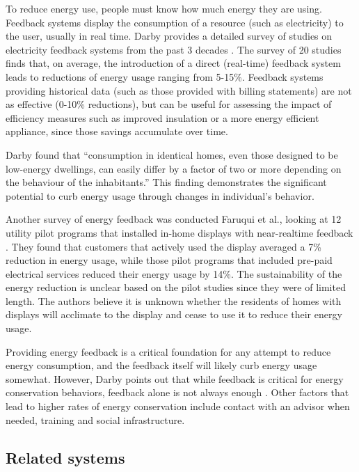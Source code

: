 To reduce energy use, people must know how much energy they are using. Feedback systems display the consumption of a resource (such as electricity) to the user, usually in real time. Darby provides a detailed survey of studies on electricity feedback systems from the past 3 decades \cite{darby-review-2006}. The survey of 20 studies finds that, on average, the introduction of a direct (real-time) feedback system leads to reductions of energy usage ranging from 5-15\%. Feedback systems providing historical data (such as those provided with billing statements) are not as effective (0-10\% reductions), but can be useful for assessing the impact of efficiency measures such as improved insulation or a more energy efficient appliance, since those savings accumulate over time.

Darby found that ``consumption in identical homes, even those designed to be low-energy dwellings, can easily differ by a factor of two or more depending on the behaviour of the inhabitants.'' This finding demonstrates the significant potential to curb energy usage through changes in individual's behavior.

Another survey of energy feedback was conducted Faruqui et al., looking at 12 utility pilot programs that installed in-home displays with near-realtime feedback \cite{Faruqui09}. They found that customers that actively used the display averaged a 7\% reduction in energy usage, while those pilot programs that included pre-paid electrical services reduced their energy usage by 14\%. The sustainability of the energy reduction is unclear based on the pilot studies since they were of limited length. The authors believe it is unknown whether the residents of homes with displays will acclimate to the display and cease to use it to reduce their energy usage.

Providing energy feedback is a critical foundation for any attempt to reduce energy consumption, and the feedback itself will likely curb energy usage somewhat. However, Darby points out that while feedback is critical for energy conservation behaviors, feedback alone is not always enough \cite{darby-2000-making-it-obvious}. Other factors that lead to higher rates of energy conservation include contact with an advisor when needed, training and social infrastructure.

\subsection{Related systems}

